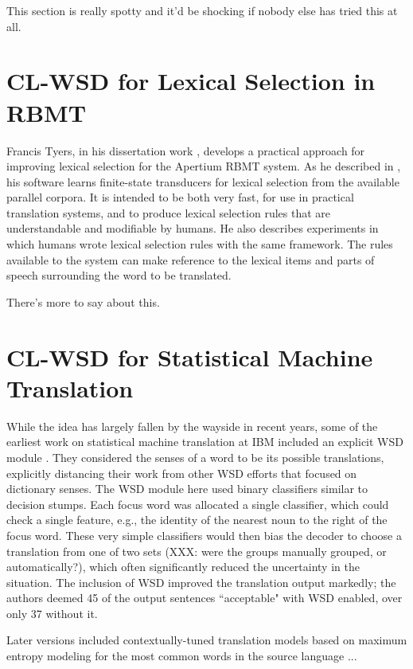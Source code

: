 This section is really spotty and it'd be shocking if nobody else has tried
this at all.

\section{CL-WSD for Lexical Selection in RBMT}
Francis Tyers, in his dissertation work \cite{tyers-dissertation}, develops a
practical approach for improving lexical selection for the Apertium RBMT
system. As he described in \cite{tyers-fst}, his software learns finite-state
transducers for lexical selection from the available parallel corpora.
It is intended to be both very fast, for use in practical translation systems,
and to produce lexical selection rules that are understandable and modifiable
by humans. He also describes experiments in which humans wrote lexical
selection rules with the same framework.
The rules available to the system can make reference to the lexical items and
parts of speech surrounding the word to be translated.

There's more to say about this.



\section{CL-WSD for Statistical Machine Translation}
While the idea has largely fallen by the wayside in recent years,
some of the earliest work on statistical machine translation at IBM included
an explicit WSD module \cite{Brown91word-sensedisambiguation}.
They considered the senses of a word to be its possible translations,
explicitly distancing their work from other WSD efforts that focused on
dictionary senses.
The WSD module here used binary classifiers similar to decision stumps. Each
focus word was allocated a single classifier, which could check a single
feature, e.g., the identity of the nearest noun to the right of the focus word.
These very simple classifiers would then bias the decoder to choose a
translation from one of two sets (XXX: were the groups manually grouped, or
automatically?), which often significantly reduced the uncertainty in the
situation. The inclusion of WSD improved the translation output markedly; the
authors deemed 45 of the output sentences ``acceptable" with WSD enabled, over
only 37 without it.

Later versions included contextually-tuned translation models based on maximum
entropy modeling for the most common words in the source language
\cite{Berger:1994:CSM:1075812.1075844} ...

